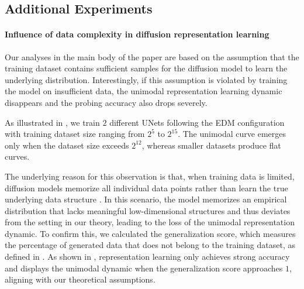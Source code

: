 
\subsection{Additional Experiments}\label{app:add_exp}

\paragraph{Influence of data complexity in diffusion representation learning}%

Our analyses in the main body of the paper are based on the assumption that the training dataset contains sufficient samples for the diffusion model to learn the underlying distribution. Interestingly, if this assumption is violated by training the model on insufficient data, the unimodal representation learning dynamic disappears and the probing accuracy also drops severely. 


As illustrated in , we train $2$ different UNets following the EDM \citep{karras2022elucidating} configuration with training dataset size ranging from $2^5$ to $2^{15}$. The unimodal curve emerges only when the dataset size exceeds $2^{12}$, whereas smaller datasets produce flat curves.


The underlying reason for this observation is that, when training data is limited, diffusion models memorize all individual data points rather than learn the true underlying data structure \citep{wang2024diffusion}. In this scenario, the model memorizes an empirical distribution that lacks meaningful low-dimensional structures and thus deviates from the setting in our theory, leading to the loss of the unimodal representation dynamic. To confirm this, we calculated the generalization score, which measures the percentage of generated data that does not belong to the training dataset, as defined in \citep{zhang2024emergence}. As shown in , representation learning only achieves strong accuracy and displays the unimodal dynamic when the generalization score approaches $1$, aligning with our theoretical assumptions.

